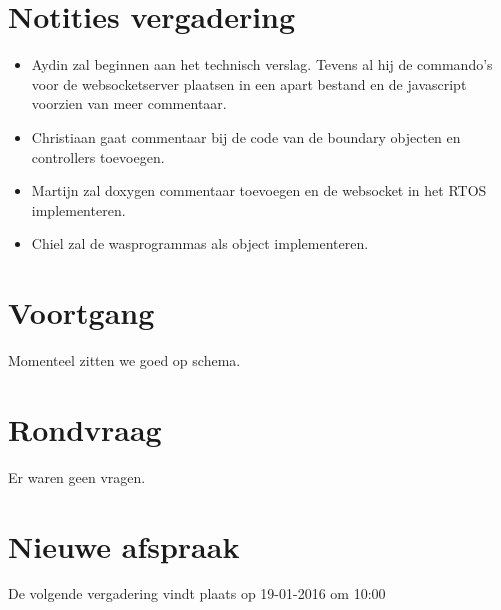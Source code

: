 \documentclass[dutch]{hu}
\begin{document}
\section{Notities vergadering}
\begin{itemize}

\item Aydin zal beginnen aan het technisch verslag. Tevens al hij de commando's voor de websocketserver plaatsen in een apart bestand en de javascript voorzien van meer commentaar.
\item Christiaan gaat commentaar bij de code van de boundary objecten en controllers toevoegen.
\item Martijn zal doxygen commentaar toevoegen en de websocket in het RTOS implementeren.
\item Chiel zal de wasprogrammas als object implementeren.

\end{itemize}

\section{Voortgang}
Momenteel zitten we goed op schema.

\section{Rondvraag}
Er waren geen vragen.

\section{Nieuwe afspraak}
De volgende vergadering vindt plaats op 19-01-2016 om 10:00
\end{document}
